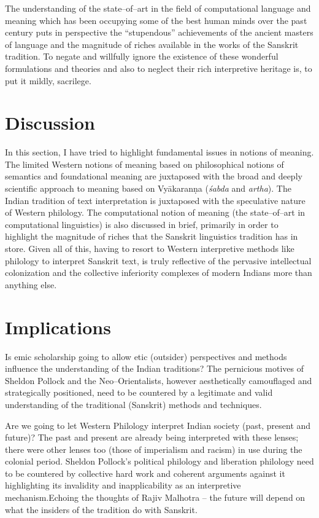The understanding of the state–of–art in the field of computational language and meaning which has been occupying some of the best human minds over the past century puts in perspective the “stupendous” achievements of the ancient masters of language and the magnitude of riches available in the works of the Sanskrit tradition. To negate and willfully ignore the existence of these wonderful formulations and theories and also to neglect their rich interpretive heritage is, to put it mildly, sacrilege.


\section*{Discussion}

\vskip -7pt

In this section, I have tried to highlight fundamental issues in notions of meaning. The limited Western notions of meaning based on philosophical notions of semantics and foundational meaning are juxtaposed with the broad and deeply scientific approach to meaning based on Vyākaranṇa (\textit{śabda} and \textit{artha}). The Indian tradition of text interpretation is juxtaposed with the speculative nature of Western philology. The computational notion of meaning (the state–of–art in computational linguistics) is also discussed in brief, primarily in order to highlight the magnitude of riches that the Sanskrit linguistics tradition has in store. Given all of this, having to resort to Western interpretive methods like philology to interpret Sanskrit text, is truly reflective of the pervasive intellectual colonization and the collective inferiority complexes of modern Indians more than anything else.


\section*{Implications}

\vskip -7pt

Is emic scholarship going to allow etic (outsider) perspectives and methods influence the understanding of the Indian traditions? The pernicious motives of Sheldon Pollock and the Neo–Orientalists, however aesthetically camouflaged and strategically positioned, need to be countered by a legitimate and valid understanding of the traditional (Sanskrit) methods and techniques.

Are we going to let Western Philology interpret Indian society (past, present and future)? The past and present are already being interpreted with these lenses; there were other lenses too (those of imperialism and racism) in use during the colonial period. Sheldon Pollock’s political philology and liberation philology need to be countered by collective hard work and coherent arguments against it highlighting its invalidity and inapplicability as an interpretive mechanism.Echoing the thoughts of Rajiv Malhotra – the future will depend on what the insiders of the tradition do with Sanskrit.

